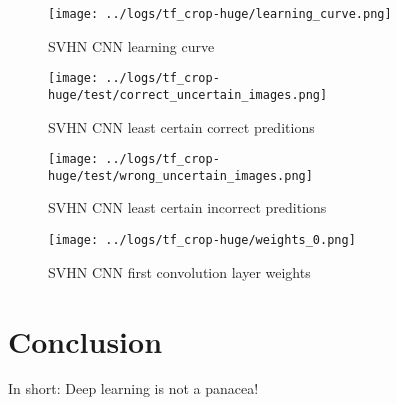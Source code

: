 \documentclass{article}
\begin{document}
\begin{figure}[htbp]
  \centering
  \texttt{[image: ../logs/tf\_crop-huge/learning\_curve.png]}
  \caption{SVHN CNN learning curve}
  \label{fig:svhn_cnn_lc}
\end{figure}

\begin{figure}[htbp]
  \centering
  \texttt{[image: ../logs/tf\_crop-huge/test/correct\_uncertain\_images.png]}
  \caption{SVHN CNN least certain correct preditions}
  \label{fig:svhn_cnn_correct_uncertain_images}
\end{figure}

\begin{figure}[htbp]
  \centering
  \texttt{[image: ../logs/tf\_crop-huge/test/wrong\_uncertain\_images.png]}
  \caption{SVHN CNN least certain incorrect preditions}
  \label{fig:svhn_cnn_wrong_uncertain_images}
\end{figure}

\begin{figure}[htbp]
  \centering
  \texttt{[image: ../logs/tf\_crop-huge/weights\_0.png]}
  \caption{SVHN CNN first convolution layer weights}
  \label{fig:svhn_cnn_weights}
\end{figure}

\section{Conclusion}

In short: Deep learning is not a panacea!

\printbibliography[heading=bibintoc,title={References}]
\end{document}
